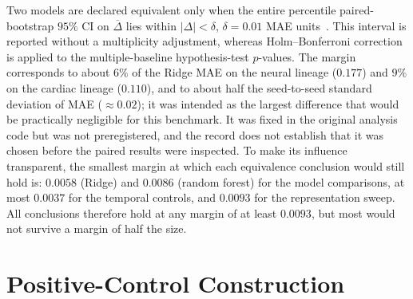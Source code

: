 \documentclass[10pt,journal,compsoc]{IEEEtran}
\begin{document}
Two models are declared equivalent only when the entire percentile paired-bootstrap $95\%$ CI on $\overline{\Delta}$ lies within $|\Delta|<\delta$, $\delta=0.01$ MAE units~\cite{lakens2017equivalence}. This interval is reported without a multiplicity adjustment, whereas Holm--Bonferroni correction is applied to the multiple-baseline hypothesis-test $p$-values. The margin corresponds to about $6\%$ of the Ridge MAE on the neural lineage ($0.177$) and $9\%$ on the cardiac lineage ($0.110$), and to about half the seed-to-seed standard deviation of MAE ($\approx0.02$); it was intended as the largest difference that would be practically negligible for this benchmark. It was fixed in the original analysis code but was not preregistered, and the record does not establish that it was chosen before the paired results were inspected. To make its influence transparent, the smallest margin at which each equivalence conclusion would still hold is: $0.0058$ (Ridge) and $0.0086$ (random forest) for the model comparisons, at most $0.0037$ for the temporal controls, and $0.0093$ for the representation sweep. All conclusions therefore hold at any margin of at least $0.0093$, but most would not survive a margin of half the size.

\section{Positive-Control Construction}
\label{sup:positive}
\end{document}
